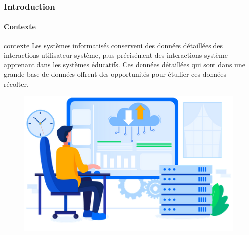 \documentclass[aspectratio=169,professionalfonts, 12pt]{beamer}
\begin{document}
\begin{frame}
  \frametitle{Introduction}
  \framesubtitle{Contexte}
  \begin{minipage}{0.5\textwidth}
    \begin{block}{contexte}
    Les systèmes informatisés conservent des données détaillées des interactions utilisateur-système, plus précisément des interactions système-apprenant dans les systèmes éducatifs. Ces données détaillées qui sont dans une grande base de données offrent des opportunités pour étudier ces données récolter.  
    \end{block}
  \end{minipage}
  \begin{minipage}{2cm}
  
  \end{minipage}
  \begin{minipage}{0.4\textwidth}
    \begin{figure}[t]
    \begin{center}
      \includegraphics[width=\textwidth]{images/etat_art/database_illustration.png}
    \end{center}
    \end{figure} 
  \end{minipage}
\end{frame}
\end{document}
